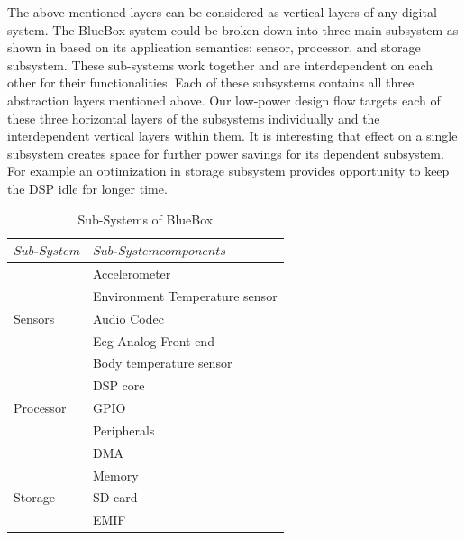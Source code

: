 The above-mentioned layers can be considered as vertical layers of
any digital system. The BlueBox system could be broken down into
three main subsystem as shown in  based on its
application semantics: sensor, processor, and storage subsystem.
These sub-systems work together and are interdependent on each other
for their functionalities. Each of these subsystems contains all
three abstraction layers mentioned above. Our low-power design flow
targets each of these three horizontal layers of the subsystems
individually and the interdependent vertical layers within them. It
is interesting that effect on a single subsystem creates space for
further power savings for its dependent subsystem. For example an
optimization in storage subsystem provides opportunity to keep the DSP
idle for longer time.

  \begin{table}
 	\caption{Sub-Systems of BlueBox}
 	\label{table:sub-system}
 	\centering
 	\begin{tabular}{|l|l|}
 		\hline
 		$Sub$-$System$ & $Sub$-$System  components$  \\
 		\hline
 		& Accelerometer \\
 		& Environment Temperature sensor \\
 		Sensors & Audio Codec \\
 		& Ecg Analog Front end \\
 		& Body temperature sensor\\
 		\hline
 		& DSP core \\
 		Processor & GPIO \\
 		& Peripherals \\
 		& DMA \\
 		& Memory \\
 		\hline
 		Storage & SD card \\
 		& EMIF \\
 		\hline
 	\end{tabular}
 \end{table}
 
